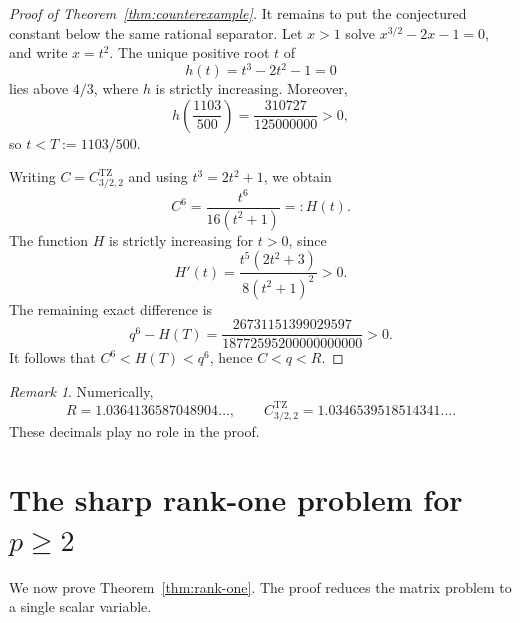 \documentclass[11pt,reqno]{amsart}
\theoremstyle{remark}
\newtheorem{remark}[theorem]{Remark}
\newcommand{\TZ}{C^{\mathrm{TZ}}}
\begin{document}
\begin{proof}[Proof of Theorem~\ref{thm:counterexample}]
It remains to put the conjectured constant below the same rational separator.
Let \(x>1\) solve \(x^{3/2}-2x-1=0\), and write \(x=t^2\).
The unique positive root \(t\) of
\begin{equation}\label{eq:t-cubic}
 h(t)=t^3-2t^2-1=0
\end{equation}
lies above \(4/3\), where \(h\) is strictly increasing.  Moreover,
\begin{equation}\label{eq:cert6}
 h\left(\frac{1103}{500}\right)
 =\frac{310727}{125000000}>0,
\end{equation}
so \(t<T:=1103/500\).

Writing \(C=\TZ_{3/2,2}\) and using \(t^3=2t^2+1\), we obtain
\[
 C^6=\frac{t^6}{16(t^2+1)}=:H(t).
\]
The function \(H\) is strictly increasing for \(t>0\), since
\[
 H'(t)=\frac{t^5(2t^2+3)}{8(t^2+1)^2}>0.
\]
The remaining exact difference is
\begin{equation}\label{eq:cert7}
 q^6-H(T)
 =
 \frac{26731151399029597}
 {18772595200000000000}>0.
\end{equation}
It follows that \(C^6<H(T)<q^6\), hence \(C<q<R\).
\end{proof}

\begin{remark}
Numerically,
\[
 R=1.0364136587048904\ldots,\qquad
 \TZ_{3/2,2}=1.0346539518514341\ldots.
\]
These decimals play no role in the proof.
\end{remark}

\section{The sharp rank-one problem for
\texorpdfstring{\(p\ge2\)}{p greater than or equal to 2}}
\label{sec:rank-one}

We now prove Theorem~\ref{thm:rank-one}.  The proof reduces the matrix
problem to a single scalar variable.
\end{document}
